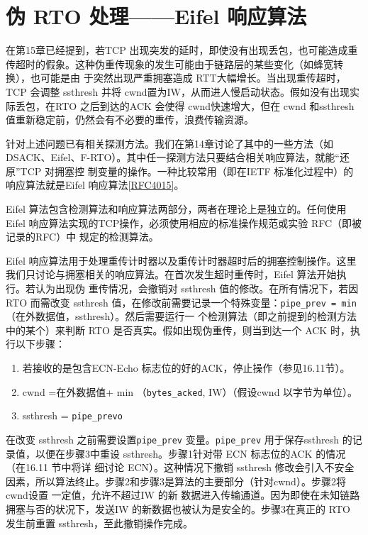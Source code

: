 \section{伪 RTO 处理——Eifel 响应算法}
在第15章已经提到，若TCP 出现突发的延时，即使没有出现丢包，也可能造成重传超时的假象。这种伪重传现象的发生可能由于链路层的某些变化（如蜂宽转换），也可能是由
于突然出现严重拥塞造成 RTT大幅增长。当出现重传超时，TCP 会调整 ssthresh 并将 cwnd置为IW，从而进人慢启动状态。假如没有出现实际丢包，在RTO 之后到达的ACK 会使得
cwnd快速增大，但在 cwnd 和ssthresh 值重新稳定前，仍然会有不必要的重传，浪费传输资源。

针对上述问题已有相关探测方法。我们在第14章讨论了其中的一些方法（如DSACK、Eifel、F-RTO）。其中任一探测方法只要结合相关响应算法，就能“还原”TCP 对拥塞控
制变量的操作。一种比较常用（即在IETF 标准化过程中）的响应算法就是Eifel 响应算法\href{https://www.rfc-editor.org/rfc/rfc4015}{[RFC4015]}。

Eifel 算法包含检测算法和响应算法两部分，两者在理论上是独立的。任何使用 Eifel 响应算法实现的TCP操作，必须使用相应的标准操作规范或实验 RFC（即被记录的RFC）中
规定的检测算法。

Eifel 响应算法用于处理重传计时器以及重传计时器超时后的拥塞控制操作。这里我们只讨论与拥塞相关的响应算法。在首次发生超时重传时，Eifel 算法开始执行。若认为出现伪
重传情况，会撤销对 ssthresh 值的修改。在所有情况下，若因 RTO 而需改变 ssthresh 值，在修改前需要记录一个特殊变量：\verb|pipe_prev = min|（在外数据值，ssthresh）。然后需要运行一
个检测算法（即之前提到的检测方法中的某个）来判断 RTO 是否真实。假如出现伪重传，则当到达一个 ACK 时，执行以下步骤：

\begin{enumerate}
    \item 若接收的是包含ECN-Echo 标志位的好的ACK，停止操作（参见16.11节）。
    \item cwnd =在外数据值+ min （\verb|bytes_acked|, IW）（假设cwnd 以字节为单位）。
    \item ssthresh = \verb|pipe_prevo|
\end{enumerate}

在改变 ssthresh 之前需要设置\verb|pipe_prev| 变量。\verb|pipe_prev| 用于保存ssthresh 的记录值，以便在步骤3中重设 ssthresh。步骤1针对带 ECN 标志位的ACK 的情况（在16.11 节中将详
细讨论 ECN）。这种情况下撤销 ssthresh 修改会引入不安全因素，所以算法终止。步骤2和步骤3是算法的主要部分（针对cwnd）。步骤2将cwnd设置 一定值，允许不超过IW 的新
数据进入传输通道。因为即使在未知链路拥塞与否的状况下，发送IW 的新数据也被认为是安全的。步骤3在真正的 RTO 发生前重置 ssthresh，至此撤销操作完成。

